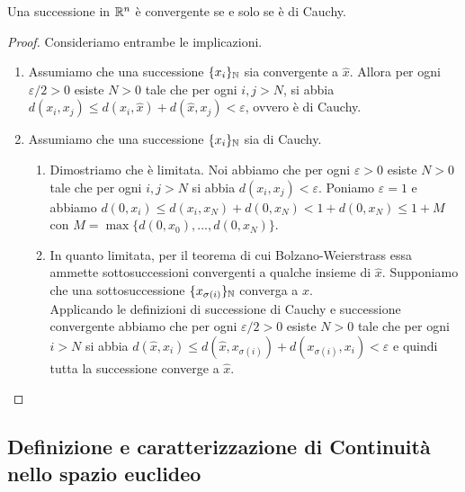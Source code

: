 \documentclass{article}
\begin{document}
\begin{theorem}{}{}
    Una successione in $\mathbb{R}^n$ è convergente se e solo se è di Cauchy.
\end{theorem}
\begin{proof}
    Consideriamo entrambe le implicazioni.\begin{enumerate}
        \item Assumiamo che una successione $\{x_i\}_{\mathbb{N}}$ sia convergente a $\hat{x}$. Allora per ogni $\varepsilon/2>0$ esiste $N>0$ tale che per ogni $i,j>N$, si abbia $d(x_i,x_j) \le d(x_i, \hat{x}) + d(\hat{x},x_j) < \varepsilon$, ovvero è di Cauchy.
        \item Assumiamo che una successione $\{x_i\}_{\mathbb{N}}$ sia di Cauchy. \begin{enumerate}
            \item Dimostriamo che è limitata. Noi abbiamo che per ogni $\varepsilon >0$ esiste $N>0$ tale che per ogni $i,j >N$ si abbia $d(x_i, x_j) < \varepsilon$. Poniamo $\varepsilon = 1$ e abbiamo $d(0, x_i) \le d(x_i, x_N) + d(0, x_N) < 1 + d(0, x_N) \le 1 + M$ con  $M = \max \{d(0,x_0), ..., d(0, x_N)\}$.
            \item In quanto limitata, per il teorema di cui Bolzano-Weierstrass essa ammette sottosuccessioni convergenti a qualche insieme di $\hat{x}$. Supponiamo che una sottosuccessione $\{x_{\sigma(i)}\}_{\mathbb{N}}$ converga a $\hat{x}$.\\
            Applicando le definizioni di successione di Cauchy e successione convergente abbiamo che per ogni $\varepsilon/2 > 0$ esiste $N>0$ tale che per ogni $i>N$ si abbia $d(\hat{x},x_i) \le d(\hat{x}, x_{\sigma(i)}) + d(x_{\sigma(i)}, x_i) < \varepsilon$ e quindi tutta la successione converge a $\hat{x}$.
        \end{enumerate}
    \end{enumerate}
\end{proof}

\subsection{Definizione e caratterizzazione di Continuità nello spazio euclideo}
\end{document}
